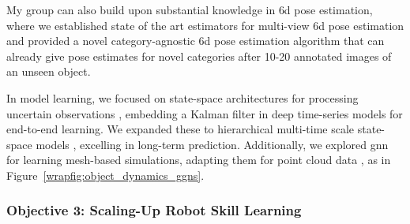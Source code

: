 \documentclass{erc-B2}
\begin{document}
My group can also build upon substantial knowledge in \gls*{6d} pose estimation, where we established state of the art estimators for multi-view \gls*{6d} pose estimation \cite{DuffhaussRAL,duffhauss22MV6D} and provided a novel category-agnostic \gls*{6d} pose estimation algorithm \cite{gao2023sad} that can already give pose estimates for novel categories after  10-20 annotated images of an unseen object. 

In model learning, we focused on state-space architectures for processing uncertain observations \cite{becker19RKN,shaj2020acrkn,shaj2022hiprssm, becker2022uncertainty}, embedding a Kalman filter in deep time-series models for end-to-end learning. We expanded these to hierarchical multi-time scale state-space models \cite{shaj2023mts3}, excelling in long-term prediction. Additionally, we explored \gls*{gnn} for learning mesh-based simulations, adapting them for point cloud data \cite{linkerhagnerFSM23}, as in Figure~\ref{wrapfig:object_dynamics_ggns}. %




\subsubsection{Objective 3: Scaling-Up Robot Skill Learning}
\end{document}
